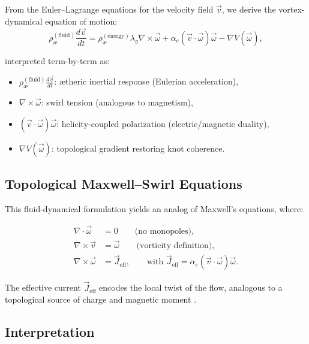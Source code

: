 From the Euler--Lagrange equations for the velocity field \( \vec{v} \), we derive the vortex-dynamical equation of motion:
\begin{equation}
\label{eq:VAM_dynamics}
\rho_\text{\ae}^{(\text{fluid})} \frac{d \vec{v}}{dt} =
\rho_\text{\ae}^{(\text{energy})} \lambda_g \nabla \times \vec{\omega}
+ \alpha_e (\vec{v} \cdot \vec{\omega}) \vec{\omega}
- \nabla V(\vec{\omega}),
\end{equation}

interpreted term-by-term as:
\begin{itemize}
    \item \( \rho_\text{\ae}^{(\text{fluid})} \frac{d \vec{v}}{dt} \): ætheric inertial response (Eulerian acceleration),
    \item \( \nabla \times \vec{\omega} \): swirl tension (analogous to magnetism),
    \item \( (\vec{v} \cdot \vec{\omega}) \vec{\omega} \): helicity-coupled polarization (electric/magnetic duality),
    \item \( \nabla V(\vec{\omega}) \): topological gradient restoring knot coherence.
\end{itemize}

\subsection*{Topological Maxwell–Swirl Equations}

This fluid-dynamical formulation yields an analog of Maxwell’s equations, where:

\begin{align}
\nabla \cdot \vec{\omega} &= 0 \qquad \text{(no monopoles)}, \label{eq:divB} \\
\nabla \times \vec{v} &= \vec{\omega} \qquad \text{(vorticity definition)}, \label{eq:curlE} \\
\nabla \times \vec{\omega} &= \vec{J}_\text{eff}, \qquad \text{with } \vec{J}_\text{eff} = \alpha_e (\vec{v} \cdot \vec{\omega}) \vec{\omega}. \label{eq:ampere}
\end{align}

The effective current \( \vec{J}_\text{eff} \) encodes the local twist of the flow, analogous to a topological source of charge and magnetic moment \cite{yakovenko2021fluid, finn2020helicity}.

\subsection*{Interpretation}

